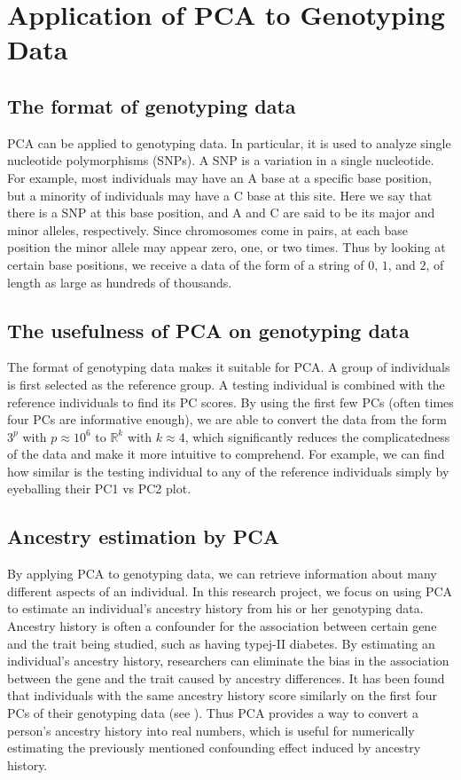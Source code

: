 \documentclass{article}[12pt]
\begin{document}
\section{Application of PCA to Genotyping Data}

\subsection{The format of genotyping data}

PCA can be applied to genotyping data.
In particular, it is used to analyze single nucleotide polymorphisms (SNPs).
A SNP is a variation in a single nucleotide.
For example, most individuals may have an A base at a specific base position, but a minority of individuals may have a C base at this site.
Here we say that there is a SNP at this base position,
and A and C are said to be its major and minor alleles, respectively.
Since chromosomes come in pairs,
at each base position the minor allele may appear zero, one, or two times.
Thus by looking at certain base positions,
we receive a data of the form of a string of $0$, $1$, and $2$,
of length as large as hundreds of thousands.

\subsection{The usefulness of PCA on genotyping data}

The format of genotyping data makes it suitable for PCA.
A group of individuals is first selected as the reference group.
A testing individual is combined with the reference individuals to find its PC scores.
By using the first few PCs (often times four PCs are informative enough), 
we are able to convert the data from the form $3^p$ with $p \approx 10^6$ to $\mathbb{R}^k$ with $k \approx 4$,
which significantly reduces the complicatedness of the data and make it more intuitive to comprehend.
For example, we can find how similar is the testing individual to any of the reference individuals simply by eyeballing their PC1 vs PC2 plot.

\subsection{Ancestry estimation by PCA}

By applying PCA to genotyping data, we can retrieve information about many different aspects of an individual.
In this research project, we focus on using PCA to estimate an individual's ancestry history from his or her genotyping data.
Ancestry history is often a confounder for the association between certain gene and the trait being studied, such as having typej-II diabetes.
By estimating an individual's ancestry history,
researchers can eliminate the bias in the association between the gene and the trait caused by ancestry differences.
It has been found that individuals with the same ancestry history score similarly on the first four PCs of their genotyping data (see \cite{wang}).
Thus PCA provides a way to convert a person's ancestry history into real numbers,
which is useful for numerically estimating the previously mentioned confounding effect induced by ancestry history.
\end{document}
